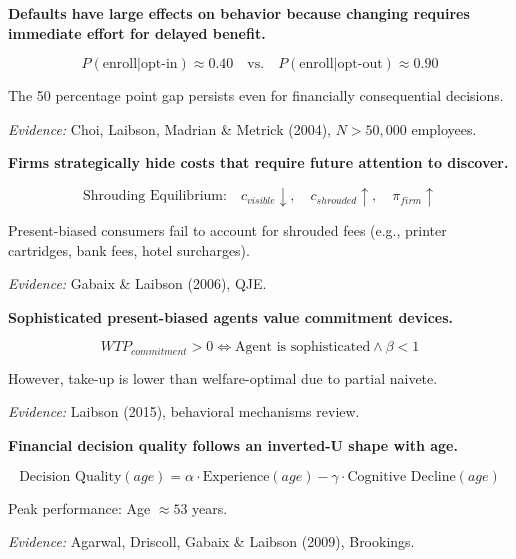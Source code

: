 \begin{tcolorbox}[colback=red!5!white,colframe=red!75!black,title=Axiom LA-2: Default Power]
\textbf{Defaults have large effects on behavior because changing requires immediate effort for delayed benefit.}

\begin{equation}
P(\text{enroll} | \text{opt-in}) \approx 0.40 \quad \text{vs.} \quad P(\text{enroll} | \text{opt-out}) \approx 0.90
\end{equation}

The 50 percentage point gap persists even for financially consequential decisions.

\textit{Evidence:} Choi, Laibson, Madrian \& Metrick (2004), $N > 50,000$ employees.
\end{tcolorbox}

\begin{tcolorbox}[colback=red!5!white,colframe=red!75!black,title=Axiom LA-3: Shrouded Attribute Exploitation]
\textbf{Firms strategically hide costs that require future attention to discover.}

\begin{equation}
\text{Shrouding Equilibrium:} \quad c_{visible} \downarrow, \quad c_{shrouded} \uparrow, \quad \pi_{firm} \uparrow
\end{equation}

Present-biased consumers fail to account for shrouded fees (e.g., printer cartridges, bank fees, hotel surcharges).

\textit{Evidence:} Gabaix \& Laibson (2006), QJE.
\end{tcolorbox}

\begin{tcolorbox}[colback=red!5!white,colframe=red!75!black,title=Axiom LA-4: Commitment Demand]
\textbf{Sophisticated present-biased agents value commitment devices.}

\begin{equation}
WTP_{commitment} > 0 \iff \text{Agent is sophisticated} \land \beta < 1
\end{equation}

However, take-up is lower than welfare-optimal due to partial naivete.

\textit{Evidence:} Laibson (2015), behavioral mechanisms review.
\end{tcolorbox}

\begin{tcolorbox}[colback=red!5!white,colframe=red!75!black,title=Axiom LA-5: Age-Cognition Interaction]
\textbf{Financial decision quality follows an inverted-U shape with age.}

\begin{equation}
\text{Decision Quality}(age) = \alpha \cdot \text{Experience}(age) - \gamma \cdot \text{Cognitive Decline}(age)
\end{equation}

Peak performance: Age $\approx 53$ years.

\textit{Evidence:} Agarwal, Driscoll, Gabaix \& Laibson (2009), Brookings.
\end{tcolorbox}

